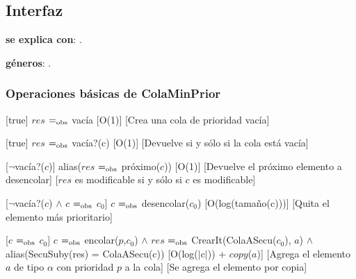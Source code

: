 \subsection{Interfaz}

	\textbf{se explica con}: .

	\textbf{géneros}: .

\subsubsection{Operaciones básicas de ColaMinPrior}

	[true]
	{$res$ $=_{\mathrm{obs}}$ vacía}
	[O(1)]
	[Crea una cola de prioridad vacía]

	[true]
	{$res$ $=_{\mathrm{obs}}$ vacía?(c)}
	[O(1)]
	[Devuelve  si y sólo si la cola está vacía]

	[$\neg$vacía?($c$)]
	{alias($res$ $=_{\mathrm{obs}}$ próximo($c$))}
	[O(1)]
	[Devuelve el próximo elemento a desencolar]
	[$res$ es modificable si y sólo si $c$ es modificable]

	[$\neg$vacía?($c$) $\land$ $c$ $=_{\mathrm{obs}}$ $c_0$]
	{$c$ $=_{\mathrm{obs}}$ desencolar($c_0$)}
	[O(log(tamaño(c)))]
	[Quita el elemento más prioritario]

	[$c$ $=_{\mathrm{obs}}$ $c_0$]
	{$c$ $=_{\mathrm{obs}}$ encolar($p$,$c_0$) $\wedge$ $res$ $=_{\mathrm{obs}}$ CrearIt(ColaASecu($c_0$), $a$) $\wedge$ alias(SecuSuby(res) = ColaASecu(c))}
	[O(log($\vert$c$\vert$)) + $copy$($a$)]
	[Agrega el elemento $a$ de tipo $\alpha$ con prioridad $p$ a la cola]
	[Se agrega el elemento por copia]




